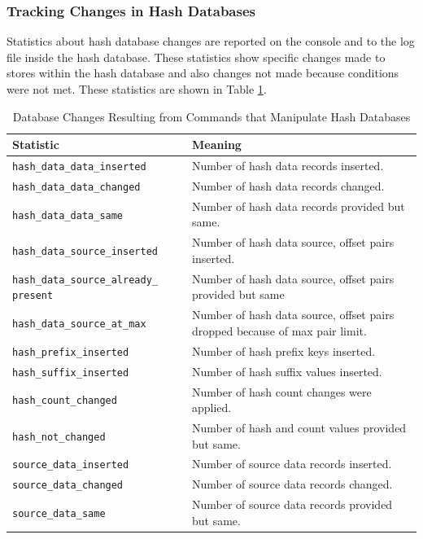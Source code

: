 \documentclass[11pt,fleqn]{article} %
\begin{document}
\subsubsection{Tracking Changes in Hash Databases}
Statistics about hash database changes are reported on the console and to the log file inside the hash database.
These statistics show specific changes made to stores within the hash database
and also changes not made because conditions were not met.
These statistics are shown in Table \ref{tab:changeStatistics}.
\begin{table}[!ht]

\centering
\caption{Database Changes Resulting from Commands that Manipulate Hash Databases}
\label{tab:changeStatistics}
\begin{tabular}{|p{5 cm}|p{8.8 cm}|}
\hline \hline
\textbf{Statistic} & \textbf{Meaning} \\
\hline

\verb+hash_data_data_inserted+ &  Number of hash data records inserted.\\
\hline
\verb+hash_data_data_changed+ &  Number of hash data records changed.\\
\hline
\verb+hash_data_data_same+ &  Number of hash data records provided but same.\\
\hline
\verb+hash_data_source_inserted+ &  Number of hash data source, offset pairs inserted.\\
\hline
\verb+hash_data_source_already_+ \verb+present+ &  Number of hash data source, offset pairs provided but same\\
\hline
\verb+hash_data_source_at_max+ &  Number of hash data source, offset pairs dropped because of max pair limit.\\
\hline

\verb+hash_prefix_inserted+ &  Number of hash prefix keys inserted.\\
\hline
\verb+hash_suffix_inserted+ &  Number of hash suffix values inserted.\\
\hline
\verb+hash_count_changed+ &  Number of hash count changes were applied.\\
\hline
\verb+hash_not_changed+ &  Number of hash and count values provided but same.\\
\hline

\verb+source_data_inserted+ &  Number of source data records inserted.\\
\hline
\verb+source_data_changed+ &  Number of source data records changed.\\
\hline
\verb+source_data_same+ &  Number of source data records provided but same.\\
\hline


\end{tabular}
\end{table}
\end{document}
